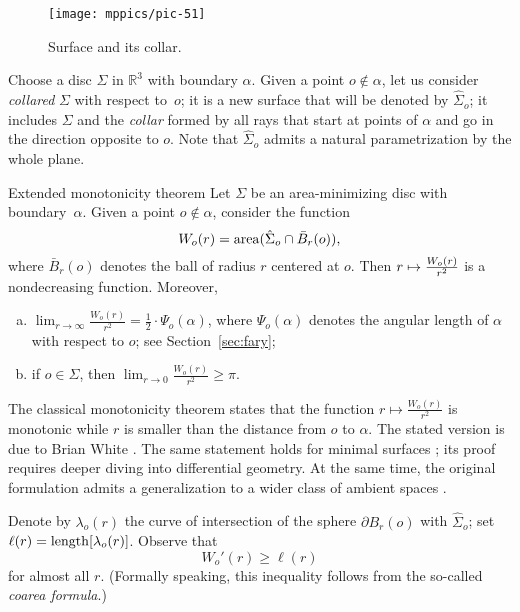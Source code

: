\begin{wrapfigure}{r}{37 mm}
\vskip-5mm
\centering
\texttt{[image: mppics/pic-51]}
\caption*{Surface and its collar.}
\vskip0mm
\end{wrapfigure}

Choose a disc $\Sigma$ in $\mathbb{R}^3$ with boundary $\alpha$.
Given a point $o\notin \alpha$, let us consider \emph{collared} $\Sigma$ with respect to~$o$;
it is a new surface that will be denoted by $\hat\Sigma_o$;
it includes $\Sigma$ and the \emph{collar} formed by all rays that start at points of $\alpha$ and go in the direction opposite to $o$.
Note that $\hat\Sigma_o$ admits a natural parametrization by the whole plane.

\begin{thm}{Extended monotonicity theorem}\label{thm:monotonicity}
Let $\Sigma$ be an area-minimizing disc with boundary~$\alpha$.
Given a point $o\notin \alpha$, consider the function 
\[W_o(r)=\mathop{\rm area}\nolimits (\hat\Sigma_o\cap \bar B_r(o)),\]
where $\bar B_r(o)$ denotes the ball of radius $r$ centered at $o$.
Then $r\z\mapsto \frac{W_o(r)}{r^2}$ is a nondecreasing function.
Moreover, 

\begin{enumerate}[(a)]
\item\label{thm:monotonicity:a}
$\lim_{r\to\infty}\frac{W_o(r)}{r^2}=\tfrac12\cdot \Psi_o(\alpha)$, where $\Psi_o(\alpha)$ denotes the angular length of $\alpha$ with respect to $o$; see Section~\ref{sec:fary};

\item\label{thm:monotonicity:b}
if $o\in \Sigma$, then $\lim_{r\to0}\frac{W_o(r)}{r^2}\ge \pi$.
\end{enumerate}

\end{thm}

The classical monotonicity theorem states that the function $r\mapsto \frac{W_o(r)}{r^2}$ is monotonic 
while $r$ is smaller than the distance from $o$ to $\alpha$.
The stated version is due to Brian White \cite{white}.
The same statement holds for minimal surfaces \cite{EWW_embed}; its proof requires deeper diving into differential geometry.
At the same time, the original formulation admits a generalization to a wider class of ambient spaces \cite{St_structure}.


Denote by $\lambda_o(r)$ the curve of intersection of the sphere $\partial B_r(o)$ with $\hat\Sigma_o$;
set $\ell(r)\z=\length[\lambda_o(r)]$.
Observe that 
\[W_o'(r)\ge \ell(r)\]
for almost all $r$.
(Formally speaking, this inequality follows from the so-called \emph{coarea formula}.)

